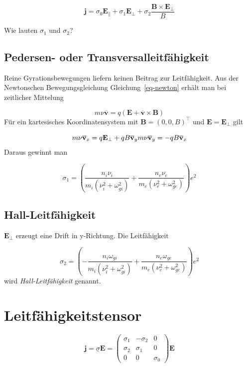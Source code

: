\documentclass[
  a4paper,
  DIV=11]{scrreprt}
\begin{document}
\[
\mathbf j = \sigma_0 \mathbf E_\| + \sigma_1 \mathbf E_\perp + \sigma_2 \frac{\mathbf B \times \mathbf E_\perp}{B}
\]

Wie lauten \(\sigma_1\) und \(\sigma_2\)?

\hypertarget{pedersen--oder-transversalleitfuxe4higkeit}{%
\subsection{Pedersen- oder
Transversalleitfähigkeit}\label{pedersen--oder-transversalleitfuxe4higkeit}}

Reine Gyrationsbewegungen liefern keinen Beitrag zur Leitfähigkeit. Aus
der Newtonschen Bewegungsgleichung Gleichung~\ref{eq-newton} erhält man
bei zeitlicher Mittelung

\[
m \nu \overline {\mathbf v} = q(\mathbf E + \overline{\mathbf v} \times \mathbf B) 
\] Für ein kartesisches Koordinatensystem mit
\(\mathbf B = (0, 0, B)^\top\) und \(\mathbf E = \mathbf E_\perp\) gilt

\[
m \nu \overline{\mathbf v}_x = q \mathbf E_\perp + q B \overline{\mathbf v}_y  \\
m \nu \overline{\mathbf v}_y = - q B \overline{\mathbf v}_x
\] Daraus gewinnt man

\[
\sigma_1 = \left(    \frac{n_i \nu_i}{m_i(\nu_i^2 + \omega_{gi}^2)} +    \frac{n_e \nu_e}{m_e(\nu_e^2 + \omega_{ge}^2)}    \right) e^2
\]

\hypertarget{hall-leitfuxe4higkeit}{%
\subsection{Hall-Leitfähigkeit}\label{hall-leitfuxe4higkeit}}

\(\mathbf E_\perp\) erzeugt eine Drift in y-Richtung. Die Leitfähigkeit

\[
\sigma_2 = \left(    -\frac{n_i \omega_{gi}}{m_i(\nu_i^2 + \omega_{gi}^2)}    +\frac{n_e \omega_{ge}}{m_e(\nu_e^2 + \omega_{ge}^2)}    \right) e^2
\] wird \emph{Hall-Leitfähigkeit} genannt.

\hypertarget{leitfuxe4higkeitstensor}{%
\section{Leitfähigkeitstensor}\label{leitfuxe4higkeitstensor}}

\[
\mathbf j = \underline\sigma \mathbf E = 
\begin{pmatrix}
\sigma_1 & -\sigma_2 & 0 \\
\sigma_2 & \sigma_1 & 0 \\
0 & 0 & \sigma_0
\end{pmatrix} \mathbf E
\]
\end{document}
